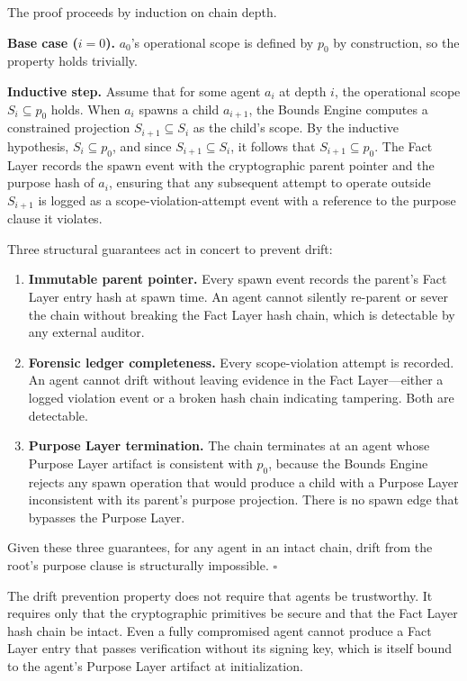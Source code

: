 \begin{Proof}
The proof proceeds by induction on chain depth.

\textbf{Base case ($i = 0$).} $a_0$'s operational scope is defined by $p_0$ by construction, so the property holds trivially.

\textbf{Inductive step.} Assume that for some agent $a_i$ at depth $i$, the operational scope $S_i \subseteq p_0$ holds. When $a_i$ spawns a child $a_{i+1}$, the Bounds Engine computes a constrained projection $S_{i+1} \subseteq S_i$ as the child's scope. By the inductive hypothesis, $S_i \subseteq p_0$, and since $S_{i+1} \subseteq S_i$, it follows that $S_{i+1} \subseteq p_0$. The Fact Layer records the spawn event with the cryptographic parent pointer and the purpose hash of $a_i$, ensuring that any subsequent attempt to operate outside $S_{i+1}$ is logged as a scope-violation-attempt event with a reference to the purpose clause it violates.

Three structural guarantees act in concert to prevent drift:

\begin{enumerate}
    \item \textbf{Immutable parent pointer.} Every spawn event records the parent's Fact Layer entry hash at spawn time. An agent cannot silently re-parent or sever the chain without breaking the Fact Layer hash chain, which is detectable by any external auditor.
    \item \textbf{Forensic ledger completeness.} Every scope-violation attempt is recorded. An agent cannot drift without leaving evidence in the Fact Layer—either a logged violation event or a broken hash chain indicating tampering. Both are detectable.
    \item \textbf{Purpose Layer termination.} The chain terminates at an agent whose Purpose Layer artifact is consistent with $p_0$, because the Bounds Engine rejects any spawn operation that would produce a child with a Purpose Layer inconsistent with its parent's purpose projection. There is no spawn edge that bypasses the Purpose Layer.
\end{enumerate}

Given these three guarantees, for any agent in an intact chain, drift from the root's purpose clause is structurally impossible. $\square$
\end{Proof}

The drift prevention property does not require that agents be trustworthy. It requires only that the cryptographic primitives be secure and that the Fact Layer hash chain be intact. Even a fully compromised agent cannot produce a Fact Layer entry that passes verification without its signing key, which is itself bound to the agent's Purpose Layer artifact at initialization.

